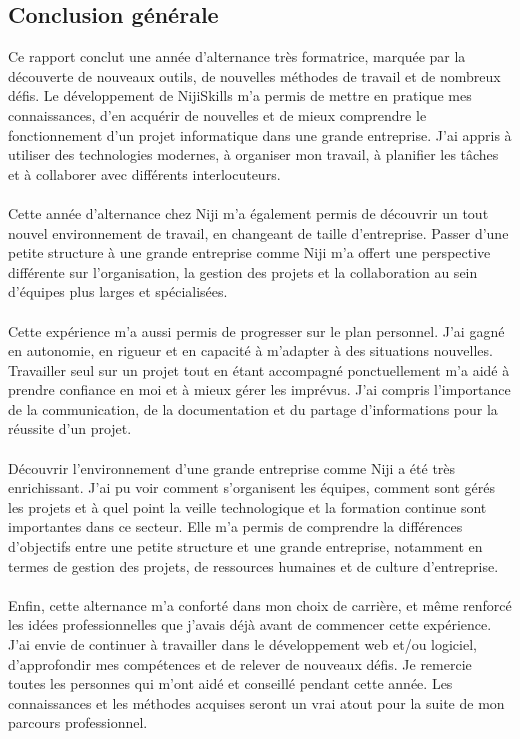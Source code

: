 \documentclass[12pt]{article}
\begin{document}
\subsection{Conclusion générale}
Ce rapport conclut une année d’alternance très formatrice, marquée par la découverte de nouveaux outils, de nouvelles méthodes de travail et de nombreux défis. Le développement de NijiSkills m’a permis de mettre en pratique mes connaissances, d’en acquérir de nouvelles et de mieux comprendre le fonctionnement d’un projet informatique dans une grande entreprise. J’ai appris à utiliser des technologies modernes, à organiser mon travail, à planifier les tâches et à collaborer avec différents interlocuteurs.
\\\\
Cette année d’alternance chez Niji m’a également permis de découvrir un tout nouvel environnement de travail, en changeant de taille d’entreprise. Passer d’une petite structure à une grande entreprise comme Niji m’a offert une perspective différente sur l’organisation, la gestion des projets et la collaboration au sein d’équipes plus larges et spécialisées.
\\\\
Cette expérience m’a aussi permis de progresser sur le plan personnel. J’ai gagné en autonomie, en rigueur et en capacité à m’adapter à des situations nouvelles. Travailler seul sur un projet tout en étant accompagné ponctuellement m’a aidé à prendre confiance en moi et à mieux gérer les imprévus. J’ai compris l’importance de la communication, de la documentation et du partage d’informations pour la réussite d’un projet.
\\\\
Découvrir l’environnement d’une grande entreprise comme Niji a été très enrichissant. J’ai pu voir comment s’organisent les équipes, comment sont gérés les projets et à quel point la veille technologique et la formation continue sont importantes dans ce secteur. Elle m'a permis de comprendre la différences d'objectifs entre une petite structure et une grande entreprise, notamment en termes de gestion des projets, de ressources humaines et de culture d'entreprise.
\\\\
Enfin, cette alternance m’a conforté dans mon choix de carrière, et même renforcé les idées professionnelles que j’avais déjà avant de commencer cette expérience. J’ai envie de continuer à travailler dans le développement web et/ou logiciel, d’approfondir mes compétences et de relever de nouveaux défis. Je remercie toutes les personnes qui m’ont aidé et conseillé pendant cette année. Les connaissances et les méthodes acquises seront un vrai atout pour la suite de mon parcours professionnel.
\newpage
\end{document}
